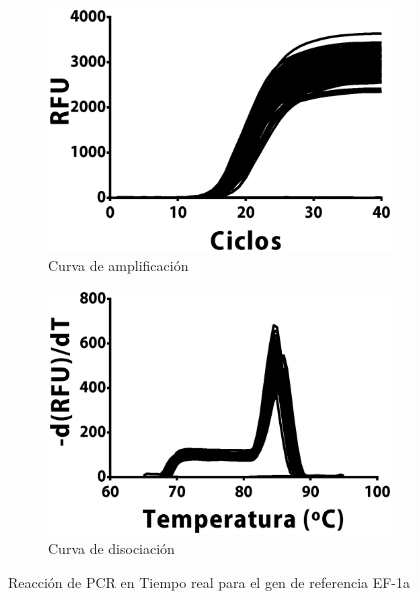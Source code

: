 \documentclass[12pt,letterpaper,oneside]{scrbook}
\begin{document}
\begin{figure}[h!]
    \centering
    \begin{subfigure}{0.32\textwidth}
        \includegraphics[width=1\textwidth]{qef1a}
        \caption{Curva de amplificación}
        \end{subfigure}
    \begin{subfigure}{0.32\textwidth}
        \includegraphics[width=01\textwidth]{qef1am}
        \caption{Curva de disociación}
    \end{subfigure}
    \caption{Reacción de PCR en Tiempo real para el gen de referencia EF-1a}
    \label{qef1a}
\end{figure}
\end{document}
